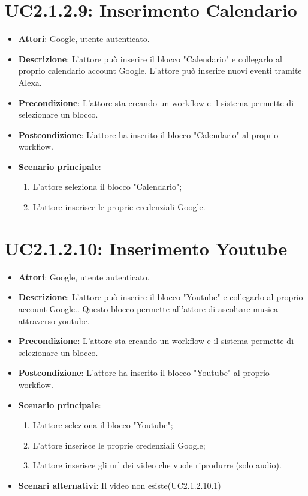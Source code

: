 \section{UC2.1.2.9: Inserimento Calendario}
\label{UC2.1.2.9}
\begin{itemize}
	\item \textbf{Attori}: Google, utente autenticato.
	\item \textbf{Descrizione}: L'attore può inserire il blocco "Calendario" e collegarlo al proprio calendario account Google. L'attore può inserire nuovi eventi tramite Alexa.
	\item \textbf{Precondizione}: L'attore sta creando un workflow e il sistema permette di selezionare un blocco.
	\item \textbf{Postcondizione}: L'attore ha inserito il blocco "Calendario" al proprio workflow.
	\item \textbf{Scenario principale}:
	\begin{enumerate} \item L'attore seleziona il blocco "Calendario";  \item  L'attore inserisce le proprie credenziali Google.\end{enumerate}
\end{itemize}

\section{UC2.1.2.10: Inserimento Youtube}
\label{UC2.1.2.10}
\begin{itemize}
	\item \textbf{Attori}: Google, utente autenticato.
	\item \textbf{Descrizione}: L'attore può inserire il blocco "Youtube" e collegarlo al proprio account Google.. Questo blocco permette all'attore di ascoltare musica attraverso youtube.
	\item \textbf{Precondizione}: L'attore sta creando un workflow e il sistema permette di selezionare un blocco.
	\item \textbf{Postcondizione}: L'attore ha inserito il blocco "Youtube" al proprio workflow.
	\item \textbf{Scenario principale}:
	\begin{enumerate} \item L'attore seleziona il blocco "Youtube";  \item  L'attore inserisce le proprie credenziali Google;  \item  L'attore inserisce gli url dei video che vuole riprodurre (solo audio).\end{enumerate}
	\item \textbf{Scenari alternativi}:
	Il video non esiste(UC2.1.2.10.1)
\end{itemize}

